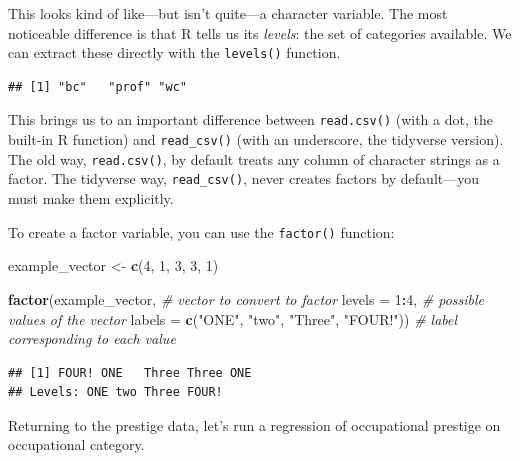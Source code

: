 \documentclass[12pt,oneside,openany]{book}
\newenvironment{Shaded}{\begin{snugshade}}{\end{snugshade}}
\newcommand{\KeywordTok}[1]{\textcolor[rgb]{0.13,0.29,0.53}{\textbf{#1}}}
\newcommand{\DataTypeTok}[1]{\textcolor[rgb]{0.13,0.29,0.53}{#1}}
\newcommand{\DecValTok}[1]{\textcolor[rgb]{0.00,0.00,0.81}{#1}}
\newcommand{\StringTok}[1]{\textcolor[rgb]{0.31,0.60,0.02}{#1}}
\newcommand{\CommentTok}[1]{\textcolor[rgb]{0.56,0.35,0.01}{\textit{#1}}}
\newcommand{\OperatorTok}[1]{\textcolor[rgb]{0.81,0.36,0.00}{\textbf{#1}}}
\newcommand{\NormalTok}[1]{#1}
\begin{document}
This looks kind of like---but isn't quite---a character variable. The
most noticeable difference is that R tells us its \emph{levels}: the set
of categories available. We can extract these directly with the
\texttt{levels()} function.

\begin{Shaded}
\end{Shaded}

\begin{verbatim}
## [1] "bc"   "prof" "wc"
\end{verbatim}

This brings us to an important difference between \texttt{read.csv()}
(with a dot, the built-in R function) and \texttt{read\_csv()} (with an
underscore, the tidyverse version). The old way, \texttt{read.csv()}, by
default treats any column of character strings as a factor. The
tidyverse way, \texttt{read\_csv()}, never creates factors by
default---you must make them explicitly.

To create a factor variable, you can use the \texttt{factor()} function:

\begin{Shaded}
\begin{Highlighting}[]
\NormalTok{example_vector <-}\StringTok{ }\KeywordTok{c}\NormalTok{(}\DecValTok{4}\NormalTok{, }\DecValTok{1}\NormalTok{, }\DecValTok{3}\NormalTok{, }\DecValTok{3}\NormalTok{, }\DecValTok{1}\NormalTok{)}

\KeywordTok{factor}\NormalTok{(example_vector,  }\CommentTok{# vector to convert to factor}
       \DataTypeTok{levels =} \DecValTok{1}\OperatorTok{:}\DecValTok{4}\NormalTok{,    }\CommentTok{# possible values of the vector}
       \DataTypeTok{labels =} \KeywordTok{c}\NormalTok{(}\StringTok{"ONE"}\NormalTok{,}
                  \StringTok{"two"}\NormalTok{,}
                  \StringTok{"Three"}\NormalTok{,}
                  \StringTok{"FOUR!"}\NormalTok{))  }\CommentTok{# label corresponding to each value}
\end{Highlighting}
\end{Shaded}

\begin{verbatim}
## [1] FOUR! ONE   Three Three ONE  
## Levels: ONE two Three FOUR!
\end{verbatim}

Returning to the prestige data, let's run a regression of occupational
prestige on occupational category.
\end{document}
